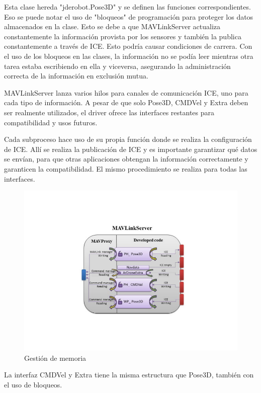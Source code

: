 Esta clase hereda "jderobot.Pose3D" y se definen las funciones correspondientes. Eso
se puede notar el uso de "bloqueos" de programación para proteger los datos almacenados en la clase. Esto se debe a que MAVLinkServer actualiza constantemente la información provista por los sensores y también la publica constantemente a través de ICE. Esto podría causar condiciones de carrera. Con el uso de los bloqueos en las clases, la información no se podía leer mientras otra tarea estaba escribiendo en ella y viceversa, asegurando la administración correcta de la información en exclusión mutua.

MAVLinkServer lanza varios hilos para canales de comunicación ICE, uno para cada tipo de información. A pesar de que solo Pose3D, CMDVel y Extra deben ser realmente utilizados, el driver ofrece las interfaces restantes para compatibilidad y usos futuros.

Cada subproceso hace uso de su propia función donde se realiza la configuración de ICE.
Allí se realiza la publicación de ICE y es importante garantizar qué datos se envían, para que otras aplicaciones obtengan la información correctamente y garanticen la compatibilidad.
El mismo procedimiento se realiza para todas las interfaces.

\begin{figure}[H]
  \centering
  \includegraphics[scale=0.6]{imagenes/MavProxyPorDentro.png}
  \caption{Gestión de memoria}
  \label{fig:MavProxyInside}
\end{figure}

La interfaz CMDVel y Extra tiene la misma estructura que Pose3D, también con el uso de bloqueos.

